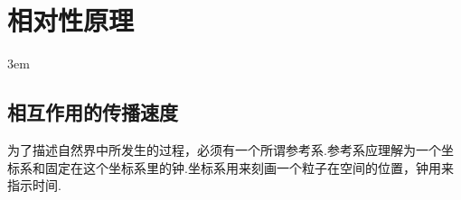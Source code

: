 \chapter{相对性原理}
\emergencystretch 3em

\section{相互作用的传播速度}

为了描述自然界中所发生的过程，必须有一个所谓参考系.参考系应理解为一个坐标系和固定在这个坐标系里的钟.坐标系用来刻画一个粒子在空间的位置，钟用来指示时间.

